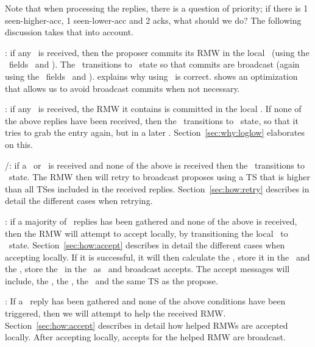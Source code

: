 Note that when processing the replies, there is a question of priority; \eg if there is 1 seen-higher-acc, 1 seen-lower-acc and 2 acks, what should we do? The following discussion takes that into account.

\squishlist

\item \alreadycom: if any \alreadycom~is received, then the proposer commits its RMW in the local \kv~(using the \locentry~fields \accval~and \acclogno). The \locentry~transitions to \bcast~state so that commits are broadcast (again using the \locentry~fields \accval~and \acclogno).  explains why using \accval\ is correct.  shows an optimization that allows us to avoid broadcast commits when not necessary.

\item \loglow: if any \loglow~is received, the RMW it contains is committed in the local \kv.
If none of the above replies have been received, then the \locentry~transitions to \need~state, so that it tries to grab the entry again, but in a later \logno. Section~\ref{sec:why:loglow} elaborates on this.

\item \highprop/\highacc: if a \highprop\ or \highacc~is received and none of the above is received then the \locentry~transitions to \retry~state. The RMW then will retry to broadcast proposes using a TS that is higher than all TSes included in the received replies. Section~\ref{sec:how:retry} describes in detail the different cases when retrying.

\item \ack: if a majority of \ack~replies has been gathered and none of the above is received, then the RMW will attempt to accept locally, by transitioning the local \kv~to \acced~state.
Section~\ref{sec:how:accept} describes in detail the different cases when accepting locally.
If it is successful, it will then calculate the \accval, store it in the \locentry~and the \kv, store the \logno~in the \locentry~as \acclogno~and broadcast accepts. The accept messages will include, the \accval, the \logno, the \rmw~and the same TS as the propose.

\item \lowacc: If a \lowacc~reply has been gathered and none of the above conditions have been triggered, then we will attempt to help the received RMW. Section~\ref{sec:how:accept} describes in detail how helped RMWs are accepted locally. After accepting locally, accepts for the helped RMW are broadcast.

